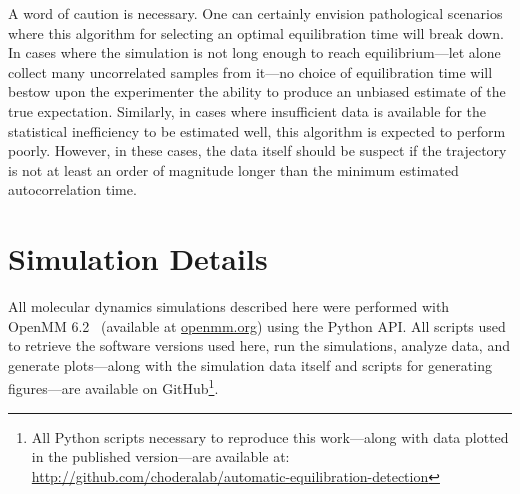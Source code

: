 \documentclass[aps,pre,twocolumn,nofootinbib,superscriptaddress,linenumbers,11point]{revtex4-1}
\begin{document}
A word of caution is necessary.
One can certainly envision pathological scenarios where this algorithm for selecting an optimal equilibration time will break down.
In cases where the simulation is not long enough to reach equilibrium---let alone collect many uncorrelated samples from it---no choice of equilibration time will bestow upon the experimenter the ability to produce an unbiased estimate of the true expectation.
Similarly, in cases where insufficient data is available for the statistical inefficiency to be estimated well, this algorithm is expected to perform poorly.
However, in these cases, the data itself should be suspect if the trajectory is not at least an order of magnitude longer than the minimum estimated autocorrelation time.


\section*{Simulation Details}
\label{section:methods}

All molecular dynamics simulations described here were performed with OpenMM 6.2~\cite{eastman:jctc:2012:openmm} (available at \href{http://openmm.org}{openmm.org}) using the Python API.
All scripts used to retrieve the software versions used here, run the simulations, analyze data, and generate plots---along with the simulation data itself and scripts for generating figures---are available on GitHub\footnote{All Python scripts necessary to reproduce this work---along with data plotted in the published version---are available at:\\
\url{http://github.com/choderalab/automatic-equilibration-detection}}.
\end{document}
